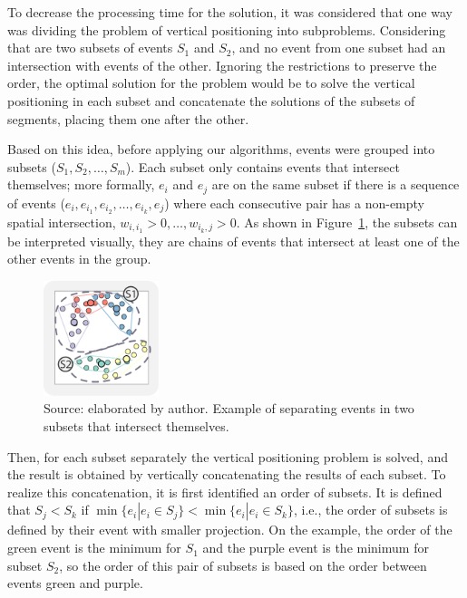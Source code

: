 To decrease the processing time for the solution, it was considered that one way was dividing the problem of vertical positioning into subproblems.
%
Considering that are two subsets of events $S_1$ and $S_2$, and no event from one subset had an intersection with events of the other. Ignoring the restrictions to preserve the order, the optimal solution for the problem would be to solve the vertical positioning in each subset and concatenate the solutions of the subsets of segments, placing them one after the other.
%

%
Based on this idea, before applying our algorithms, events were grouped into subsets ($S_1, S_2, \dots, S_m$).
%
Each subset only contains events that intersect themselves; more formally, $e_i$ and $e_j$ are on the same subset if there is a sequence of events ($e_i, e_{i_1}, e_{i_2}, \dots, e_{i_k}, e_j $) where each consecutive pair has a non-empty spatial intersection, $w_{i,i_1} > 0, \dots, w_{i_k,j} > 0$. 
%
As shown in Figure~\ref{fig:subset-events}, the subsets can be interpreted visually, they are chains of events that intersect at least one of the other events in the group.

\begin{figure}
    \centering
    \includegraphics[width = 0.3\textwidth]{src/imgs/subset-events.pdf}
    \caption{Source: elaborated by author. Example of separating events in two subsets that intersect themselves.}
    \label{fig:subset-events}
\end{figure}

Then, for each subset separately the vertical positioning problem is solved, and the result is obtained by vertically concatenating the results of each subset. To realize this concatenation, it is first identified an order of subsets.
%
It is defined that $S_j < S_k$ if $\min \{e_i | e_i \in S_j \} < \min \{ e_i | e_i \in S_k \}$, i.e., the order of subsets is defined by their event with smaller projection.
%
On the example, the order of the green event is the minimum for $S_1$ and the purple event is the minimum for subset $S_2$, so the order of this pair of subsets is based on the order between events green and purple.

